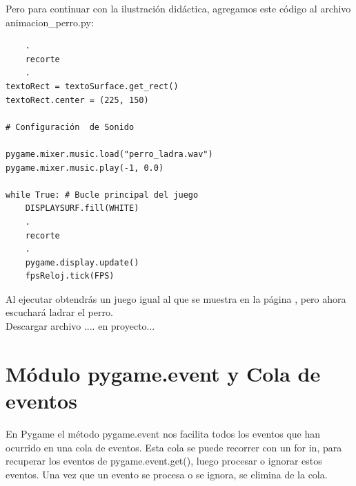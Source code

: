 Pero para continuar con la ilustración didáctica, agregamos este código al archivo  {\ttfamily animacion\_perro.py}:

\hspace{-2.9cm}{\ttfamily \scriptsize animacion}

\vspace{-0.2cm}
\hspace{-2.5cm}{\ttfamily \scriptsize \_perro.py}\vspace{-0.84cm}
\begin{lstlisting}		
	.
	recorte
	.
textoRect = textoSurface.get_rect()
textoRect.center = (225, 150)

# Configuración  de Sonido

pygame.mixer.music.load("perro_ladra.wav")
pygame.mixer.music.play(-1, 0.0)

while True: # Bucle principal del juego
    DISPLAYSURF.fill(WHITE)
    .
    recorte
    .
    pygame.display.update()
    fpsReloj.tick(FPS)
\end{lstlisting}
	
Al ejecutar obtendrás un juego igual al que se muestra en la página  \pageref{perroLadra}, pero ahora escuchará ladrar el perro.  \\
	
Descargar archivo .... en proyecto...	


\section{Módulo pygame.event y Cola de eventos}\label{eventos} 

En Pygame el método {\ttfamily pygame.event} nos facilita  todos los eventos que han ocurrido en una cola de eventos. 
Esta cola se puede recorrer con un {\ttfamily for in}, para recuperar los eventos de {\ttfamily pygame.event.get()}, luego  procesar o ignorar estos eventos.  Una vez que un evento se procesa o se ignora, se elimina de la cola. 


